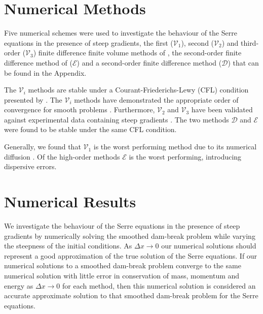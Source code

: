 \documentclass[times]{elsarticle}
\begin{document}
\section{Numerical Methods}
\label{sec:nummeth}
Five numerical schemes were used to investigate the behaviour of the Serre equations in the presence of steep gradients, the first ($\mathcal{V}_1$), second ($\mathcal{V}_2$) and third-order ($\mathcal{V}_3$) finite difference finite volume methods of  \citet{Zoppou-etal-2017}, the second-order finite difference method of \citet{El-etal-2006} ($\mathcal{E}$) and a second-order finite difference method ($\mathcal{D}$) that can be found in the Appendix.

The $\mathcal{V}_i$ methods are stable under a Courant-Friederichs-Lewy (CFL) condition  presented by \citet{Harten-etal-1983-357}. The $\mathcal{V}_i$ methods have demonstrated the appropriate order of convergence for smooth problems \cite{Zoppou-etal-2017}. Furthermore, $\mathcal{V}_2$ and $\mathcal{V}_3$ have been validated against experimental data containing steep gradients \cite{Zoppou-etal-2017}. The two methods $\mathcal{D}$ and $\mathcal{E}$ were found to be stable under the same CFL condition.

Generally, we found that $\mathcal{V}_1$ is the worst performing method due to its numerical diffusion \cite{Zoppou-etal-2017}. Of the high-order methods $\mathcal{E}$ is the worst performing, introducing dispersive errors.

\section{Numerical Results}
\label{section:NumRes}
We investigate the behaviour of the Serre equations in the presence of steep gradients by numerically solving the smoothed dam-break problem while varying the steepness of the initial conditions. As $\Delta x \rightarrow 0$ our numerical solutions should represent a good approximation of the true solution of the Serre equations. If our numerical solutions to a smoothed dam-break problem converge to the same numerical solution with little error in conservation of mass, momentum and energy as $\Delta x \rightarrow 0$ for each method, then this numerical solution is considered an accurate approximate solution to that smoothed dam-break problem for the Serre equations.
\end{document}
